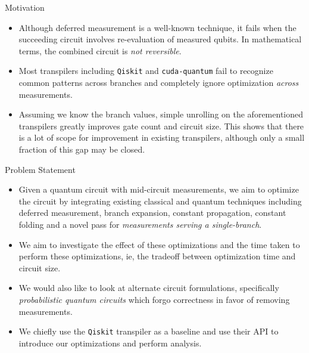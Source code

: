\documentclass[10pt]{beamer}
\begin{document}
\begin{frame}{Motivation}
  \begin{itemize}
    \item Although deferred measurement is a well-known technique, it fails when the succeeding circuit involves re-evaluation of measured qubits. In mathematical terms, the combined circuit is \emph{not reversible}.

      \pause

    \item Most transpilers including \texttt{Qiskit} \cite{qiskit2024} and \texttt{cuda-quantum} \cite{cudaq} fail to recognize common patterns across branches and completely ignore optimization \emph{across} measurements.

      \pause

    \item Assuming we know the branch values, simple unrolling on the aforementioned transpilers greatly improves gate count and circuit size. This shows that there is a lot of scope for improvement in existing transpilers, although only a small fraction of this gap may be closed.
  \end{itemize}

\end{frame}


\begin{frame}{Problem Statement}
  \begin{itemize}
    \item Given a quantum circuit with mid-circuit measurements, we aim to optimize the circuit by integrating existing classical and quantum techniques including deferred measurement, branch expansion, constant propagation, constant folding and a novel pass for \emph{measurements serving a single-branch}.

      \pause

    \item We aim to investigate the effect of these optimizations and the time taken to perform these optimizations, ie, the tradeoff between optimization time and circuit size.

      \pause

    \item We would also like to look at alternate circuit formulations, specifically \emph{probabilistic quantum circuits} \cite{prob} which forgo correctness in favor of removing measurements. 

      \pause

    \item We chiefly use the \texttt{Qiskit} transpiler as a baseline and use their API to introduce our optimizations and perform analysis.

  \end{itemize}

\end{frame}
\end{document}
